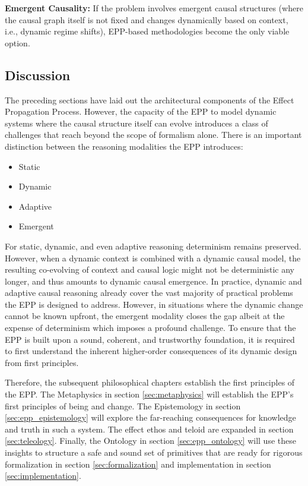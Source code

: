 \textbf{Emergent Causality:} If the problem involves emergent causal structures (where the causal graph itself is not fixed and changes dynamically based on context, i.e., dynamic regime shifts), EPP-based methodologies become the only viable option.



\newpage

\subsection{Discussion}
\label{sec:epp_discussion}

The preceding sections have laid out the architectural components of the Effect Propagation Process. However, the capacity of the EPP to model dynamic systems where the causal structure itself can evolve introduces a class of challenges that reach beyond the scope of formalism alone. There is an important distinction between the reasoning modalities the EPP introduces:

\begin{itemize}
	\item Static
	\item Dynamic
	\item Adaptive 
	\item Emergent 
\end{itemize}

For static, dynamic, and even adaptive reasoning determinism remains preserved. However, when a dynamic context is combined with a dynamic causal model, the resulting co-evolving of context and causal logic might not be deterministic any longer, and thus amounts to dynamic causal emergence. In practice, dynamic and adaptive causal reasoning already cover the vast majority of practical problems the EPP is designed to address. However, in situations where the dynamic change cannot be known upfront, the emergent modality closes the gap albeit at the expense of determinism which imposes a profound challenge. To ensure that the EPP is built upon a sound, coherent, and trustworthy foundation, it is required to first understand the inherent higher-order consequences of its dynamic design from first principles.

Therefore, the subsequent philosophical chapters establish the first principles of the EPP. The Metaphysics in section \ref{sec:metaphysics} will establish the EPP's first principles of being and change. The Epistemology in section \ref{sec:epp_epistemology} will explore the far-reaching consequences for knowledge and truth in such a system. The effect ethos and teloid are expanded in section \ref{sec:teleology}. Finally, the Ontology in section \ref{sec:epp_ontology} will use these insights to structure a safe and sound set of primitives that are ready for rigorous formalization in section \ref{sec:formalization} and implementation in section \ref{sec:implementation}. 

\newpage